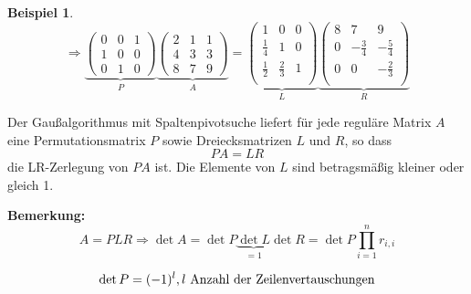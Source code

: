 \documentclass[a4paper,10pt]{article}
\newtheorem[L]{satz}{Satz}[section]
\newtheorem{bsp}{Beispiel}[section]
\newtheorem[S]{beweis}{Beweis}
\newtheorem[S]{beh}{Behauptung}
\begin{document}
\begin{bsp}
  \[
    \Rightarrow
    \underbrace{\begin{pmatrix}
       0 & 0 & 1 \\
       1 & 0 & 0 \\
       0 & 1 & 0
    \end{pmatrix}}_P
    \underbrace{\begin{pmatrix}
       2 & 1 & 1 \\
       4 & 3 & 3 \\
       8 & 7 & 9
    \end{pmatrix}}_A
    =
    \underbrace{\begin{pmatrix}
       1 & 0 & 0 \\
       \frac{1}{4} & 1 & 0 \\
       \frac{1}{2} & \frac{2}{3} & 1 \\
    \end{pmatrix}}_L
    \underbrace{\begin{pmatrix}
       8 & 7 & 9 \\
       0 & -\frac{3}{4} & -\frac{5}{4} \\
       0 & 0 & -\frac{2}{3} \\
    \end{pmatrix}}_R
  \]
\end{bsp}

\begin{satz}
  Der Gaußalgorithmus mit Spaltenpivotsuche liefert für jede reguläre Matrix $A$ eine Permutationsmatrix $P$ sowie Dreiecksmatrizen $L$ und $R$, so dass
  \[
    PA = LR
  \]
  die LR-Zerlegung von $PA$ ist. Die Elemente von $L$ sind betragsmäßig kleiner oder gleich 1.
\end{satz}

\textbf{Bemerkung:}
\[
  A = PLR \Rightarrow \det A = \det P \underbrace{\det L}_{=1} \det R = \det P \prod_{i=1}^n r_{i,i}
\]

\[
  \det P = (-1)^l, l\textnormal{ Anzahl der Zeilenvertauschungen}
\]
\end{document}
